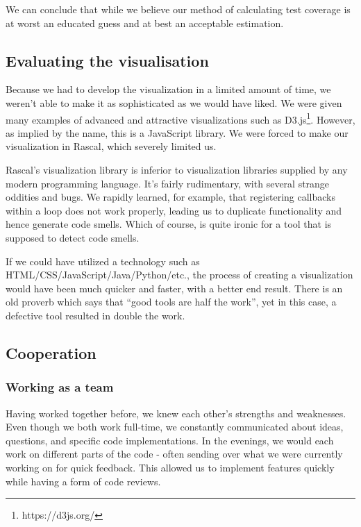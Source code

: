 \documentclass{article}
\begin{document}
We can conclude that while we believe our method of calculating test coverage is at worst an educated guess and at best an acceptable estimation.

\subsection{Evaluating the visualisation}
Because we had to develop the visualization in a limited amount of time, we weren't able to make it as sophisticated as we would have liked.
We were given many examples of advanced and attractive visualizations such as D3.js\footnote{https://d3js.org/}.
However, as implied by the name, this is a JavaScript library.
We were forced to make our visualization in Rascal, which severely limited us. 

Rascal's visualization library is inferior to visualization libraries supplied by any modern programming language.
It's fairly rudimentary, with several strange oddities and bugs. 
We rapidly learned, for example, that registering callbacks within a loop does not work properly, leading us to duplicate functionality and hence generate code smells. 
Which of course, is quite ironic for a tool that is supposed to detect code smells.

If we could have utilized a technology such as HTML/CSS/JavaScript/Java/Python/etc., the process of creating a visualization would have been much quicker and faster, with a better end result. 
There is an old proverb which says that “good tools are half the work”, yet in this case, a defective tool resulted in double the work.



\subsection{Cooperation}
\subsubsection{Working as a team}
Having worked together before, we knew each other's strengths and weaknesses. Even though we both work full-time, we constantly communicated about ideas, questions, and specific code implementations. 
In the evenings, we would each work on different parts of the code - often sending over what we were currently working on for quick feedback. This allowed us to implement features quickly while having a form of code reviews.
\end{document}
